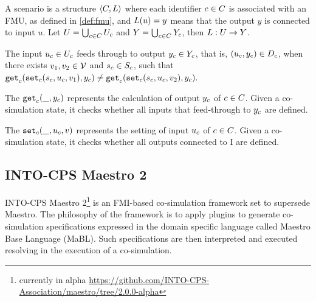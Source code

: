 \documentclass[runningheads]{llncs}
\begin{document}
\begin{definition}[Scenario]\label{def:cosim_scenario}
  A scenario is a structure $ \left\langle C, L \right\rangle $ where each identifier $c \in C$ is associated with an FMU, as defined in \ref{def:fmu}, and $L(u)=y$ means that the output $y$ is connected to input $u$.
  Let $U = \bigcup_{c \in C} U_{c}$ and $Y = \bigcup_{c \in C} Y_{c}$, then $L : U \to Y$.
\end{definition}

\begin{definition}\label{def:feedthrough}
  The input $u_{c} \in U_{c}$ feeds through to output $y_{c} \in Y_{c}$, that is, $(u_{c},y_{c}) \in D_{c}$, when there exists $v_1, v_2 \in \mathcal{V}$ and $s_{c} \in S_{c}$, such that
  $
  \mathtt{get}_{c} (\mathtt{set}_{c}(s_{c}, u_{c}, v_1), y_{c}) \neq \mathtt{get}_{c} (\mathtt{set}_{c}(s_{c}, u_{c}, v_2), y_{c}).
  $
\end{definition}

\begin{definition}\label{def:getout}
The $\mathtt{get}_{c}(\_, y_{c})$ represents the calculation of output $y_{c}$ of $c \in C$. Given a co-simulation state, it checks whether all inputs that feed-through to $y_{c}$ are defined.
\end{definition}

\begin{definition}\label{def:setin}
The $\mathtt{set}_{c}(\_, u_{c}, v)$ represents the setting of input $u_{c}$  of $c \in C$. Given a co-simulation state, it checks whether all outputs connected to I are defined.
\end{definition}

\subsection{INTO-CPS Maestro 2}
INTO-CPS Maestro 2\footnote{currently in alpha \url{https://github.com/INTO-CPS-Association/maestro/tree/2.0.0-alpha}}\cite{thule_maestro2_2019} is an FMI-based co-simulation framework set to supersede Maestro\cite{Maestro}. The philosophy of the framework is to apply plugins to generate co-simulation specifications expressed in the domain specific language called Maestro Base Language (MaBL). Such specifications are then interpreted and executed resolving in the execution of a co-simulation.
\end{document}
